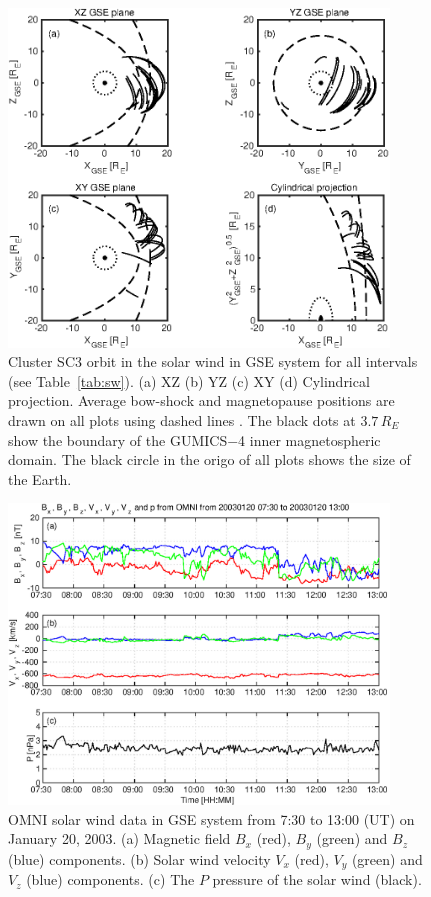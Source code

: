\documentclass[draft]{agujournal2019}
\begin{document}
\begin{figure}[h]
\centering
\includegraphics[width=0.9\textwidth,angle=0]{swe-2021sw002807-f01} 
\caption{Cluster SC3 orbit in the solar wind in GSE system for all intervals (see Table~\ref{tab:sw}). (a) XZ (b) YZ (c) XY (d) Cylindrical projection. Average bow-shock and magnetopause positions are drawn on all plots using dashed lines \cite[respectively]{peredo95:_three_alfven_mach,tsyganenko95:_model_earth}. The black dots at $3.7\,R_E$ show the boundary of the GUMICS$-$4 inner magnetospheric domain. The black circle in the origo of all plots shows the size of the Earth.}
\label{fig:sworbit}
\end{figure}

\pagebreak

\begin{figure}[h]
\centering
\includegraphics[width=0.9\textwidth,angle=0]{swe-2021sw002807-f02} 
\caption{OMNI solar wind data in GSE system from 7:30 to 13:00 (UT) on January 20, 2003. (a) Magnetic field $B_{x}$ (red), $B_{y}$ (green) and $B_{z}$ (blue) components. (b) Solar wind velocity $V_{x}$ (red), $V_{y}$ (green) and $V_{z}$ (blue) components. (c) The $P$ pressure of the solar wind (black).}

\label{fig:swomni}
\end{figure}
\end{document}
